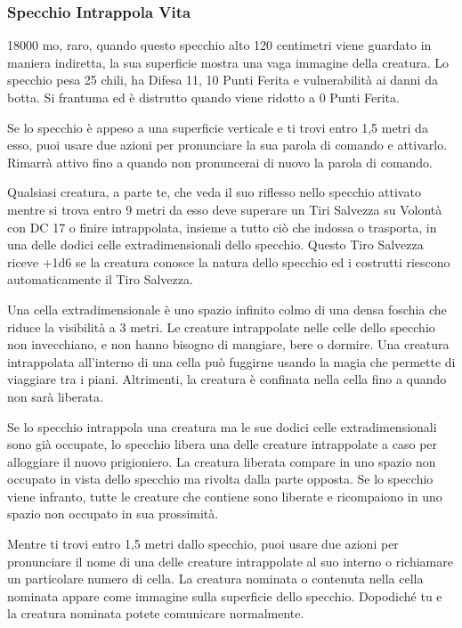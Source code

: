 \begin{multicols}{2}
\subsubsection*{Specchio Intrappola Vita}
18000 mo, raro, quando questo specchio alto 120 centimetri viene guardato in maniera indiretta, la sua superficie mostra una vaga immagine della creatura. Lo specchio pesa 25 chili, ha Difesa 11, 10 Punti Ferita e vulnerabilità ai danni da botta. Si frantuma ed è distrutto quando viene ridotto a 0 Punti Ferita.

Se lo specchio è appeso a una superficie verticale e ti trovi entro 1,5 metri da esso, puoi usare due azioni per pronunciare la sua parola di comando e attivarlo. Rimarrà attivo fino a quando non pronuncerai di nuovo la parola di comando.

Qualsiasi creatura, a parte te, che veda il suo riflesso nello specchio attivato mentre si trova entro 9 metri da esso deve superare un Tiri Salvezza su Volontà con DC 17 o finire intrappolata, insieme a tutto ciò che indossa o trasporta, in una delle dodici celle extradimensionali dello specchio. Questo Tiro Salvezza riceve +1d6 se la creatura conosce la natura dello specchio ed i costrutti riescono automaticamente il Tiro Salvezza.

Una cella extradimensionale è uno spazio infinito colmo di una densa foschia che riduce la visibilità a 3 metri. Le creature intrappolate nelle celle dello specchio non invecchiano, e non hanno bisogno di mangiare, bere o dormire. Una creatura intrappolata all'interno di una cella può fuggirne usando la magia che permette di viaggiare tra i piani. Altrimenti, la creatura è confinata nella cella fino a quando non sarà liberata.

Se lo specchio intrappola una creatura ma le sue dodici celle extradimensionali sono già occupate, lo specchio libera una delle creature intrappolate a caso per alloggiare il nuovo prigioniero. La creatura liberata compare in uno spazio non occupato in vista dello specchio ma rivolta dalla parte opposta. Se lo specchio viene infranto, tutte le creature che contiene sono liberate e ricompaiono in uno spazio non occupato in sua prossimità.

Mentre ti trovi entro 1,5 metri dallo specchio, puoi usare due azioni per pronunciare il nome di una delle creature intrappolate al suo interno o richiamare un particolare numero di cella. La creatura nominata o contenuta nella cella nominata appare come immagine sulla superficie dello specchio. Dopodiché tu e la creatura nominata potete comunicare normalmente.


\end{multicols}
